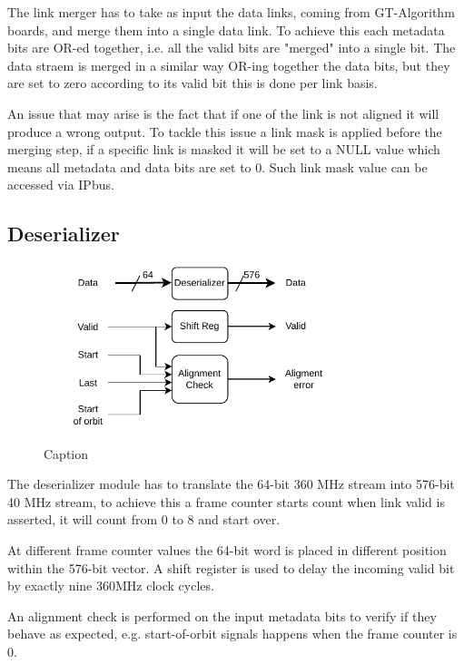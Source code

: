 \documentclass[a4paper,11pt]{article}
\begin{document}
The link merger has to take as input the data links, coming from GT-Algorithm boards, and merge them into a single data link. To achieve this each metadata bits are OR-ed together, i.e. all the valid bits are "merged" into a single bit. The data straem is merged in a similar way OR-ing together the data bits, but they are set to zero according to its valid bit this is done per link basis.  

An issue that may arise is the fact that if one of the link is not aligned it will produce a wrong output. To tackle this issue a link mask is applied before the merging step, if a specific link is masked it will be set to a NULL value which means all metadata and data bits are set to 0.  
Such link mask value can be accessed via IPbus.

\subsection{Deserializer}

\begin{figure}[h]
    \centering
    \includegraphics[width=0.75\textwidth]{Images/Modules/Deserializer.pdf}
    \caption{Caption}
    \label{fig:Deser}
\end{figure}

The deserializer module has to translate the 64-bit 360 MHz stream into 576-bit 40 MHz stream, to achieve this a frame counter starts count when link valid is asserted, it will count from 0 to 8 and start over.  

At different frame counter values the 64-bit word is placed in different position within the 576-bit vector.  
A shift register is used to delay the incoming valid bit by exactly nine 360MHz clock cycles.  

An alignment check is performed on the input metadata bits to verify if they behave as expected, e.g. start-of-orbit signals happens when the frame counter is 0.
\end{document}

